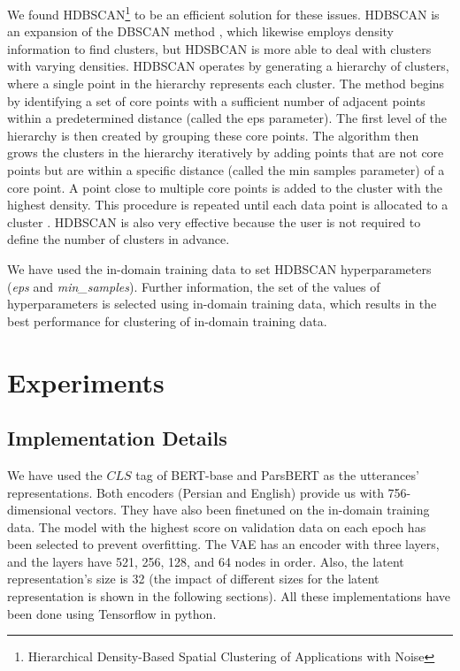 \documentclass{article}
\begin{document}
We found HDBSCAN\footnote{Hierarchical Density-Based Spatial Clustering of Applications with Noise} to be an efficient solution for these issues. 
HDBSCAN is an expansion of the DBSCAN method \citep{10.1007/978-3-642-37456-2_14}, 
which likewise employs density information to find clusters, 
but HDSBCAN is more able to deal with clusters with varying densities. 
HDBSCAN operates by generating a hierarchy of clusters, where a single point in the hierarchy represents each cluster. 
The method begins by identifying a set of core points with a sufficient number of adjacent points within a predetermined distance (called the eps parameter). 
The first level of the hierarchy is then created by grouping these core points. 
The algorithm then grows the clusters in the hierarchy iteratively by adding points that are not core points 
but are within a specific distance (called the min samples parameter) of a core point. 
A point close to multiple core points is added to the cluster with the highest density. 
This procedure is repeated until each data point is allocated to a cluster \citep{McInnes2017}. 
HDBSCAN is also very effective because the user is not required to define the number of clusters in advance. 

We have used the in-domain training data to set HDBSCAN hyperparameters (\emph{eps} and \emph{min\_samples}). 
Further information, the set of the values of hyperparameters is selected using in-domain training data, 
which results in the best performance for clustering of in-domain training data.

\section{Experiments}\label{experiments}

\subsection{Implementation Details}

\noindent We have used the $CLS$ tag of BERT-base and ParsBERT as the utterances' representations. 
Both encoders (Persian and English) provide us with 756-dimensional vectors. 
They have also been finetuned on the in-domain training data. 
The model with the highest score on validation data on each epoch has been selected to prevent overfitting. 
The VAE has an encoder with three layers, and the layers have 521, 256, 128, and 64 nodes in order. 
Also, the latent representation's size is 32 (the impact of different sizes for the latent representation is shown in the following sections). 
All these implementations have been done using Tensorflow in python.
\end{document}

